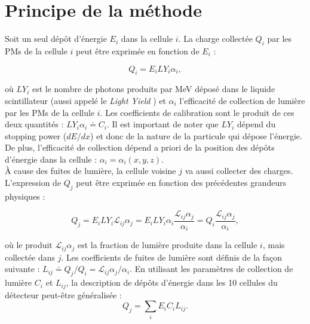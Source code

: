 \section{Principe de la méthode}
\label{seq:Erec_formalisme}

Soit un seul dépôt d'énergie $E_i$ dans la cellule $i$. La charge collectée $Q_i$ par les PMs de la cellule $i$ peut être exprimée en fonction de $E_i$ :

\begin{equation}
     Q_i = E_iLY_i\alpha_i,
\end{equation}

\bigbreak

où $LY_i$ est le nombre de photons produits par MeV déposé dans le liquide scintillateur (aussi appelé le \og \textit{Light Yield} \fg{}) et $\alpha_i$ l'efficacité de collection de lumière par les PMs de la cellule $i$. Les \og coefficients de calibration\fg{} sont le produit de ces deux quantités : $LY_i\alpha_i \doteq C_i$. Il est important de noter que $LY_i$ dépend du stopping power ($dE/dx$) et donc de la nature de la particule qui dépose l'énergie. De plus, l'efficacité de collection dépend a priori de la position des dépôts d'énergie dans la cellule : $\alpha_i = \alpha_i(x,y,z)$.\\

À cause des fuites de lumière, la cellule voisine $j$ va aussi collecter des charges. L'expression de $Q_j$ peut être exprimée en fonction des précédentes grandeurs physiques :

\begin{equation}
  \label{eq:light_leaks_expression}
  Q_j = E_i LY_i \mathcal{L}_{ij} \alpha_j = E_i LY_i \alpha_i \frac{\mathcal{L}_{ij} \alpha_j}{\alpha_i} = Q_i\frac{\mathcal{L}_{ij} \alpha_j}{\alpha_i},
\end{equation}

\bigbreak

 où le produit $\mathcal{L}_{ij}\alpha_j$ est la fraction de lumière produite dans la cellule $i$, mais collectée dans $j$. Les \og coefficients de fuites de lumière\fg{} sont définis de la façon suivante : $L_{ij} \doteq Q_j/Q_i = \mathcal{L}_{ij} \alpha_j / \alpha_i$. En utilisant les paramètres de collection de lumière $C_i$ et $L_{ij}$, la description de dépôts d'énergie dans les 10 cellules du détecteur peut-être généralisée :\\

 \begin{equation}
\label{eq:qtot_expression}
     Q_j = \sum_{i} E_iC_iL_{ij}.
 \end{equation}

